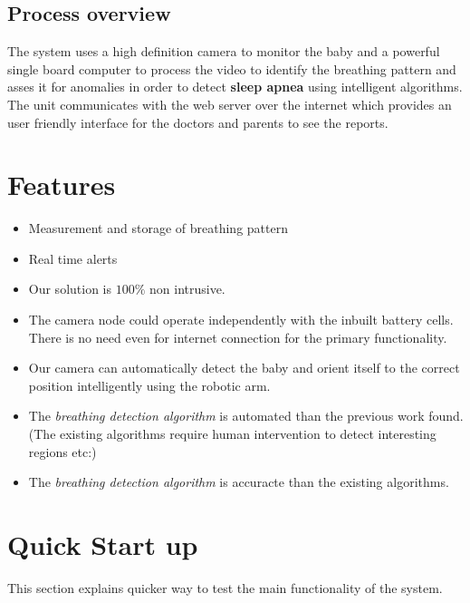 \documentclass{article}
\begin{document}
\subsection{Process overview}
The system uses a high definition camera to monitor the baby and a powerful single board computer to process the video to identify the breathing pattern and asses it for anomalies in order to detect \textbf{sleep apnea} using intelligent algorithms. The unit communicates with the web server over the internet which provides an user friendly interface for the doctors and parents to see the reports. 


\section{Features}

\begin{itemize}
    \item Measurement and storage of breathing pattern
    \item Real time alerts
    \item Our solution is $100\%$ non intrusive.
    \item The camera node could operate independently with the inbuilt battery cells. There is no need even for internet connection for the primary functionality.
    \item Our camera can automatically detect the baby and orient itself to the correct position intelligently using the robotic arm.
    \item The \textit{breathing detection algorithm} is automated than the previous work found. (The existing algorithms require human intervention to detect interesting regions etc:)
    \item The \textit{breathing detection algorithm} is accuracte than the existing algorithms.


\end{itemize}

\section{Quick Start up}    %

This section explains quicker way to test the main functionality of the system.
\end{document}
